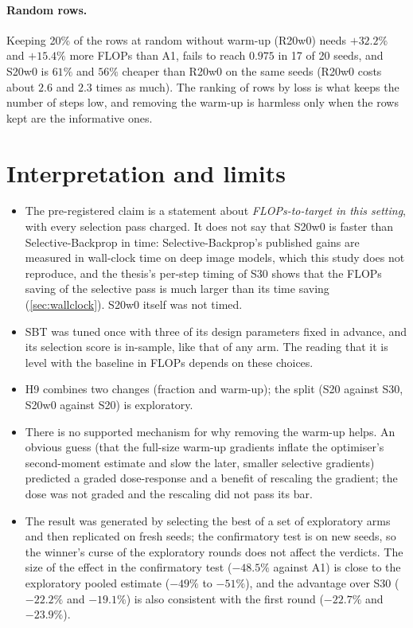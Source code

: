 \paragraph{Random rows.} Keeping 20\% of the rows at random without warm-up (R20w0) needs $+32.2\%$ and $+15.4\%$ more FLOPs than A1, fails to reach $0.975$ in 17 of 20 seeds, and S20w0 is $61\%$ and $56\%$ cheaper than R20w0 on the same seeds (R20w0 costs about $2.6$ and $2.3$ times as much). The ranking of rows by loss is what keeps the number of steps low, and removing the warm-up is harmless only when the rows kept are the informative ones.

\section{Interpretation and limits}
\begin{itemize}
\item The pre-registered claim is a statement about \emph{FLOPs-to-target in this setting}, with every selection pass charged. It does not say that S20w0 is faster than Selective-Backprop in time: Selective-Backprop's published gains are measured in wall-clock time on deep image models, which this study does not reproduce, and the thesis's per-step timing of S30 shows that the FLOPs saving of the selective pass is much larger than its time saving (\cref{sec:wallclock}). S20w0 itself was not timed.
\item SBT was tuned once with three of its design parameters fixed in advance, and its selection score is in-sample, like that of any arm. The reading that it is level with the baseline in FLOPs depends on these choices.
\item H9 combines two changes (fraction and warm-up); the split (S20 against S30, S20w0 against S20) is exploratory.
\item There is no supported mechanism for why removing the warm-up helps. An obvious guess (that the full-size warm-up gradients inflate the optimiser's second-moment estimate and slow the later, smaller selective gradients) predicted a graded dose-response and a benefit of rescaling the gradient; the dose was not graded and the rescaling did not pass its bar.
\item The result was generated by selecting the best of a set of exploratory arms and then replicated on fresh seeds; the confirmatory test is on new seeds, so the winner's curse of the exploratory rounds does not affect the verdicts. The size of the effect in the confirmatory test ($-48.5\%$ against A1) is close to the exploratory pooled estimate ($-49\%$ to $-51\%$), and the advantage over S30 ($-22.2\%$ and $-19.1\%$) is also consistent with the first round ($-22.7\%$ and $-23.9\%$).
\end{itemize}

